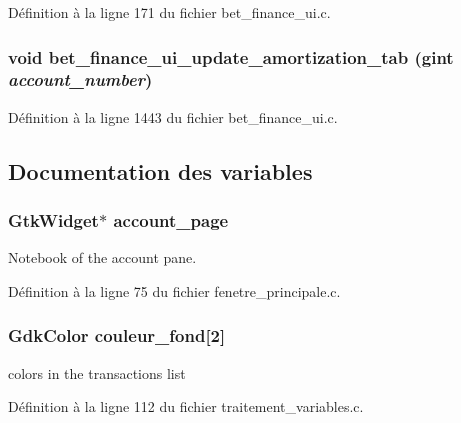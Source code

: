 Définition à la ligne 171 du fichier bet\_\-finance\_\-ui.c.

\subsubsection[{bet\_\-finance\_\-ui\_\-update\_\-amortization\_\-tab}]{\setlength{\rightskip}{0pt plus 5cm}void bet\_\-finance\_\-ui\_\-update\_\-amortization\_\-tab (gint {\em account\_\-number})}\label{bet__finance__ui_8c_ad177ea31ac56791c3a4e91ad9be07e5c}


Définition à la ligne 1443 du fichier bet\_\-finance\_\-ui.c.



\subsection{Documentation des variables}
\subsubsection[{account\_\-page}]{\setlength{\rightskip}{0pt plus 5cm}GtkWidget$\ast$ {\bf account\_\-page}}\label{bet__finance__ui_8c_ad5443d986a9ab5d64dd84c5346c4b87c}
Notebook of the account pane. 

Définition à la ligne 75 du fichier fenetre\_\-principale.c.

\subsubsection[{couleur\_\-fond}]{\setlength{\rightskip}{0pt plus 5cm}GdkColor {\bf couleur\_\-fond}[2]}\label{bet__finance__ui_8c_a58089bf9225ae2e274165369f8bc7a00}
colors in the transactions list 

Définition à la ligne 112 du fichier traitement\_\-variables.c.

